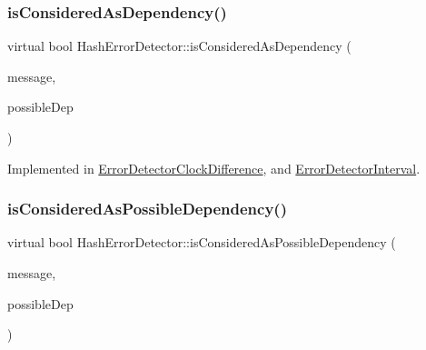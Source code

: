 \mbox{\label{classHashErrorDetector_a4693d4d5e327b19f75088cef52bcad7d}} 
\subsubsection{\texorpdfstring{is\+Considered\+As\+Dependency()}{isConsideredAsDependency()}}
{\footnotesize\ttfamily virtual bool Hash\+Error\+Detector\+::is\+Considered\+As\+Dependency (\begin{DoxyParamCaption}\item[{const \hyperlink{structures_8h_a7e7bdc1d2fff8a9436f2f352b2711ed6}{message\+Info} \&}]{message,  }\item[{const \hyperlink{structures_8h_a7e7bdc1d2fff8a9436f2f352b2711ed6}{message\+Info} \&}]{possible\+Dep }\end{DoxyParamCaption})\hspace{0.3cm}{\ttfamily [pure virtual]}}



Implemented in \hyperlink{classErrorDetectorClockDifference_a4d399849b1872d3273fa757ee9dc9bd9}{Error\+Detector\+Clock\+Difference}, and \hyperlink{classErrorDetectorInterval_a27cb3ca9d7e5c3ddda9ee5ee66f182ed}{Error\+Detector\+Interval}.

\mbox{\label{classHashErrorDetector_ac0a25b9c1e27f98223869d11ca46d18f}} 
\subsubsection{\texorpdfstring{is\+Considered\+As\+Possible\+Dependency()}{isConsideredAsPossibleDependency()}}
{\footnotesize\ttfamily virtual bool Hash\+Error\+Detector\+::is\+Considered\+As\+Possible\+Dependency (\begin{DoxyParamCaption}\item[{const \hyperlink{structures_8h_a7e7bdc1d2fff8a9436f2f352b2711ed6}{message\+Info} \&}]{message,  }\item[{const \hyperlink{structures_8h_a7e7bdc1d2fff8a9436f2f352b2711ed6}{message\+Info} \&}]{possible\+Dep }\end{DoxyParamCaption})\hspace{0.3cm}{\ttfamily [pure virtual]}}




